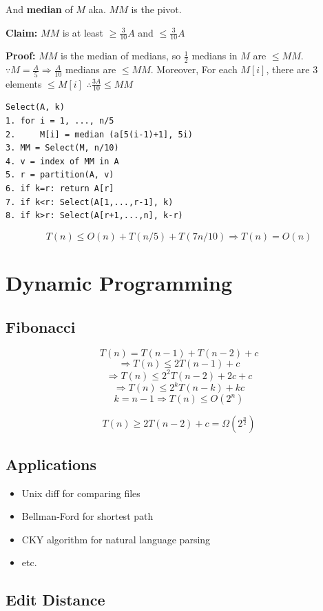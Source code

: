 \documentclass[12pt,a4paper]{article}
\begin{document}
And \textbf{median} of $M$ aka. $MM$ is the pivot.

\textbf{Claim:} $MM$ is at least $\geq \frac{3}{10}A$ and $\leq \frac{3}{10}A$

\textbf{Proof:} $MM$ is the median of medians, so $\frac{1}{2}$ medians in $M$ are $\leq MM$.
$\because M = \frac{A}{5} \Rightarrow \frac{A}{10}$ medians are $\leq MM$. Moreover, 
For each $M[i]$, there are 3 elements $\leq M[i]$ $\therefore \frac{3A}{10} \leq MM$

\begin{verbatim}
Select(A, k)
1. for i = 1, ..., n/5
2.     M[i] = median (a[5(i-1)+1], 5i)
3. MM = Select(M, n/10)
4. v = index of MM in A
5. r = partition(A, v)
6. if k=r: return A[r]
7. if k<r: Select(A[1,...,r-1], k)
8. if k>r: Select(A[r+1,...,n], k-r)
\end{verbatim}

\[T(n) \leq O(n) + T(n/5) + T(7n/10) \Rightarrow T(n) = O(n)\]

\section*{Dynamic Programming}

\subsection*{Fibonacci}

\[T(n) = T(n-1) + T(n-2) + c\]
\[\Rightarrow T(n) \leq 2T(n-1) + c\]
\[\Rightarrow T(n) \leq 2^2T(n-2) + 2c + c\]
\[\Rightarrow T(n) \leq 2^kT(n-k) + kc\]
\[k = n - 1 \Rightarrow T(n) \leq O(2^n)\]

\[T(n) \geq 2T(n-2) + c = \Omega(2^{\frac{n}{2}})\]

\subsection*{Applications}

\begin{itemize}
  \item Unix diff for comparing files
  \item Bellman-Ford for shortest path
  \item CKY algorithm for natural language parsing
  \item etc.
\end{itemize}

\subsection*{Edit Distance}
\end{document}
